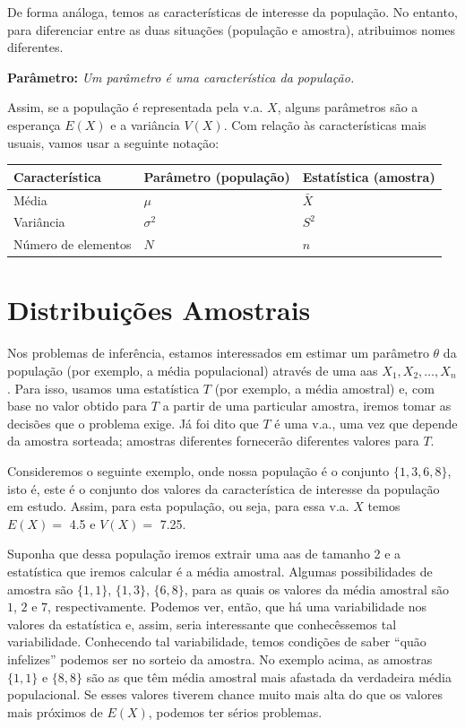 \documentclass[
]{book}
\begin{document}
De forma análoga, temos as características de interesse da população. No entanto, para diferenciar entre as duas situações (população e amostra), atribuimos nomes diferentes.

\textbf{Parâmetro:} \emph{Um parâmetro é uma característica da população.}

Assim, se a população é representada pela v.a. \(X\), alguns parâmetros são a esperança \(E(X)\) e a variância \(V(X)\). Com relação às características mais usuais, vamos usar a seguinte notação:

\begin{longtable}[]{@{}lll@{}}
\toprule
Característica & Parâmetro (população) & Estatística (amostra) \\
\midrule
\endhead
Média & \(\mu\) & \(\bar X\) \\
Variância & \(\sigma^2\) & \(S^2\) \\
Número de elementos & \(N\) & \(n\) \\
\bottomrule
\end{longtable}

\hypertarget{distribuiuxe7uxf5es-amostrais}{%
\section{Distribuições Amostrais}\label{distribuiuxe7uxf5es-amostrais}}

Nos problemas de inferência, estamos interessados em estimar um parâmetro \(\theta\) da população (por exemplo, a média populacional) através de uma aas \(X_1, X_2, \ldots, X_n\). Para isso, usamos uma estatística \(T\) (por exemplo, a média amostral) e, com base no valor obtido para \(T\) a partir de uma particular amostra, iremos tomar as decisões que o problema exige. Já foi dito que \(T\) é uma v.a., uma vez que depende da amostra sorteada; amostras diferentes fornecerão diferentes valores para \(T\).

Consideremos o seguinte exemplo, onde nossa população é o conjunto \(\{1,3,6,8\}\), isto é, este é o conjunto dos valores da característica de interesse da população em estudo. Assim, para esta população, ou seja, para essa v.a. \(X\) temos \(E(X)=\) 4.5 e \(V(X)=\) 7.25.

Suponha que dessa população iremos extrair uma aas de tamanho 2 e a estatística que iremos calcular é a média amostral. Algumas possibilidades de amostra são \(\{1,1\}\), \(\{1,3\}\), \(\{6,8\}\), para as quais os valores da média amostral são \(1\), \(2\) e \(7\), respectivamente. Podemos ver, então, que há uma variabilidade nos valores da estatística e, assim, seria interessante que conhecêssemos tal variabilidade. Conhecendo tal variabilidade, temos condições de saber ``quão infelizes'' podemos ser no sorteio da amostra. No exemplo acima, as amostras \(\{1,1\}\) e \(\{8,8\}\) são as que têm média amostral mais afastada da verdadeira média populacional. Se esses valores tiverem chance muito mais alta do que os valores mais próximos de \(E(X)\), podemos ter sérios problemas.
\end{document}
